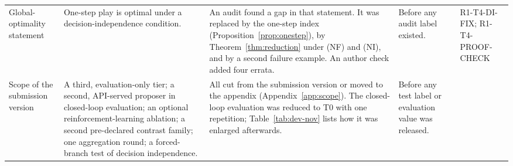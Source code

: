 \begin{table}[t]
\begin{tabular}{L{0.8in}L{1.3in}L{1.9in}L{1.25in}L{0.98in}}
\addlinespace
Global-optimality statement &
One-step play is optimal under a decision-independence condition. &
An audit found a gap in that statement. It was replaced by the one-step index (Proposition~\ref{prop:onestep}), by Theorem~\ref{thm:reduction} under (NF) and (NI), and by a second failure example. An author check added four errata. &
Before any audit label existed. &
R1-T4-DI-FIX; R1-T4-PROOF-CHECK \\
\addlinespace
Scope of the submission version &
A third, evaluation-only tier; a second, API-served proposer in closed-loop evaluation; an optional reinforcement-learning ablation; a second pre-declared contrast family; one aggregation round; a forced-branch test of decision independence. &
All cut from the submission version or moved to the appendix (Appendix~\ref{app:scope}). The closed-loop evaluation was reduced to T0 with one repetition; Table~\ref{tab:dev-nov} lists how it was enlarged afterwards. &
Before any test label or evaluation value was released. &
 \\
\bottomrule
\end{tabular}
\end{table}

